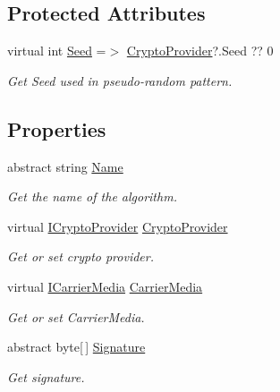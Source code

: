 \subsection*{Protected Attributes}
\begin{DoxyCompactItemize}
\item 
virtual int \hyperlink{class_stegosaurus_1_1_algorithm_1_1_stego_algorithm_base_a8fb7f33711a582b1e102efa2c85e250f}{Seed} =$>$ \hyperlink{class_stegosaurus_1_1_algorithm_1_1_stego_algorithm_base_a58a15b795b59a77a818c12dd41b13841}{Crypto\+Provider}?.Seed ?? 0
\begin{DoxyCompactList}\small\item\em Get Seed used in pseudo-\/random pattern. \end{DoxyCompactList}\end{DoxyCompactItemize}
\subsection*{Properties}
\begin{DoxyCompactItemize}
\item 
abstract string \hyperlink{class_stegosaurus_1_1_algorithm_1_1_stego_algorithm_base_a348f32065aef0fec157f90d252edd71c}{Name}
\begin{DoxyCompactList}\small\item\em Get the name of the algorithm. \end{DoxyCompactList}\item 
virtual \hyperlink{interface_stegosaurus_1_1_cryptography_1_1_i_crypto_provider}{I\+Crypto\+Provider} \hyperlink{class_stegosaurus_1_1_algorithm_1_1_stego_algorithm_base_a58a15b795b59a77a818c12dd41b13841}{Crypto\+Provider}
\begin{DoxyCompactList}\small\item\em Get or set crypto provider. \end{DoxyCompactList}\item 
virtual \hyperlink{interface_stegosaurus_1_1_carrier_1_1_i_carrier_media}{I\+Carrier\+Media} \hyperlink{class_stegosaurus_1_1_algorithm_1_1_stego_algorithm_base_a5e77d196ee5a592ddf85184743c288e0}{Carrier\+Media}
\begin{DoxyCompactList}\small\item\em Get or set Carrier\+Media. \end{DoxyCompactList}\item 
abstract byte\mbox{[}$\,$\mbox{]} \hyperlink{class_stegosaurus_1_1_algorithm_1_1_stego_algorithm_base_ace06936bcfcd9e9d9bb08ff97b1144f0}{Signature}
\begin{DoxyCompactList}\small\item\em Get signature. \end{DoxyCompactList}\end{DoxyCompactItemize}


